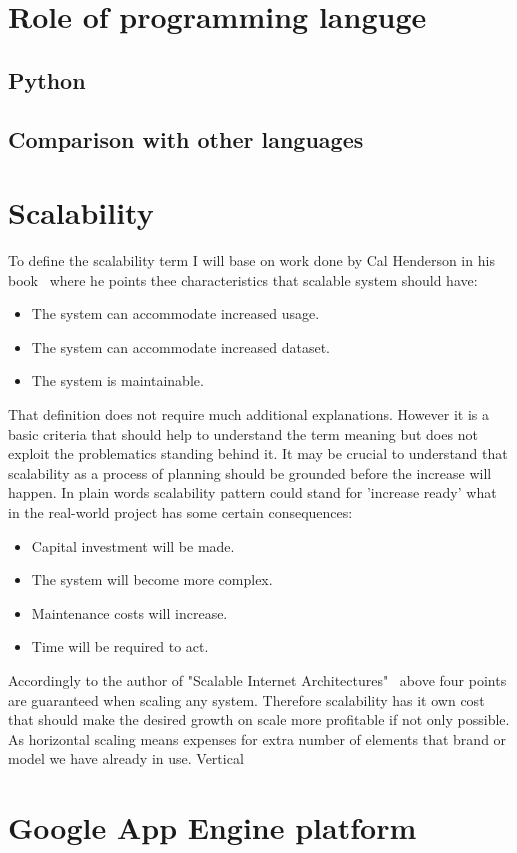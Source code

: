\section{Role of programming languge}\label{sec:language}
\subsection{Python}\label{subsec:py}
\subsection{Comparison with other languages}\label{subsec:lang_compare}
\section{Scalability}\label{sec:scalability}
To define the scalability term I will base on work done by Cal Henderson in his book~\cite[pages 203--204]{build_scalable} where he points thee characteristics that scalable system should have:
\begin{itemize}
\item{The system can accommodate increased usage.}
\item{The system can accommodate increased dataset.}
\item{The system is maintainable.}
\end{itemize}
That definition does not require much additional explanations. However it is a basic criteria that should help to understand the term meaning but does not exploit the problematics standing behind it. It may be crucial to understand that scalability as a process of planning should be grounded before the increase will happen. In plain words scalability pattern could stand for 'increase ready' what in the real-world project has some certain consequences:
\begin{itemize}
\item{Capital investment will be made.}
\item{The system will become more complex.}
\item{Maintenance costs will increase.}
\item{Time will be required to act.}
\end{itemize}
Accordingly to the author of  "Scalable Internet Architectures"~\cite[page 8]{scalable_arch} above four points are guaranteed when scaling any system. Therefore scalability has it own cost that should make the desired growth on scale more profitable if not only possible. As horizontal scaling means expenses for extra number of elements that brand or model we have already in use. Vertical   





\section{Google App Engine platform}\label{sec:gae_general}